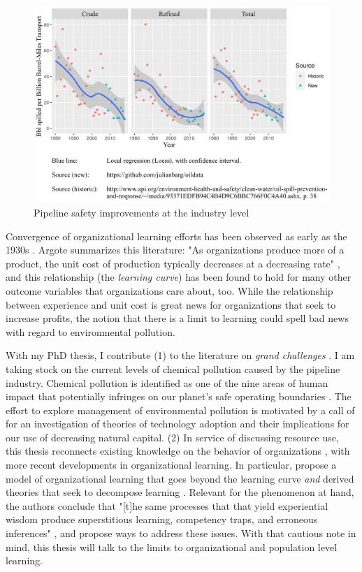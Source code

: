 \begin{figure}
	\caption{Pipeline safety improvements at the industry level}
	\centerline{\includegraphics{../illustrations/population_learning_4.png}}
\end{figure}

Convergence of organizational learning efforts has been observed as early as the 1930s \citep{Wright1936}. Argote summarizes this literature: "As organizations produce more of a product, the unit cost of production typically decreases at a decreasing rate" \citep[p. 1]{Argote2013-1}, and this relationship (the \textit{learning curve}) has been found to hold for many other outcome variables that organizations care about, too. While the relationship between experience and unit cost is great news for organizations that seek to increase profits, the notion that there is a limit to learning could spell bad news with regard to environmental pollution. 

With my PhD thesis, I contribute (1) to the literature on \textit{grand challenges} \citep{George2016}. I am taking stock on the current levels of chemical pollution caused by the pipeline industry. Chemical pollution is identified as one of the nine areas of human impact that potentially infringes on our planet's safe operating boundaries \citep{Rockstrom2009a}. The effort to explore management of environmental pollution is motivated by a call of \citet{George2015} for an investigation of theories of technology adoption and their implications for our use of decreasing natural capital. (2) In service of discussing resource use, this thesis reconnects existing knowledge on the behavior of organizations \citep{March1963}, with more recent developments in organizational learning. In particular, \citet{Levitt1988} propose a model of organizational learning that goes beyond the learning curve \textit{and} derived theories that seek to decompose learning \citep[e.g.,][p. 2]{Argote2013-1}. Relevant for the phenomenon at hand, the authors conclude that "[t]he same processes that that yield experiential wisdom produce superstitious learning, competency traps, and erroneous inferences" \citep[p. 335]{Levitt1988}, and propose ways to address these issues. With that cautious note in mind, this thesis will talk to the limits to organizational and population level learning.

